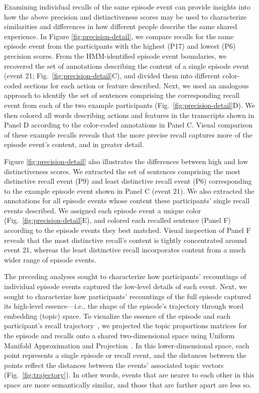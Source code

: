 \documentclass[10pt]{article}
\begin{document}
Examining individual recalls of the same episode event can provide insights into how the above precision and distinctiveness scores may be used to characterize similarities and differences in how different people describe the same shared experience.  In Figure \ref{fig:precision-detail}, we compare recalls for the same episode event from the participants with the highest (P17) and lowest (P6) precision scores.  From the HMM-identified episode event boundaries, we recovered the set of annotations describing the content of a single episode event (event 21; Fig.~\ref{fig:precision-detail}C), and divided them into different color-coded sections for each action or feature described.  Next, we used an analogous approach to identify the set of sentences comprising the corresponding recall event from each of the two example participants (Fig.~\ref{fig:precision-detail}D).  We then colored all words describing actions and features in the transcripts shown in Panel D according to the color-coded annotations in Panel C.  Visual comparison of these example recalls reveals that the more precise recall captures more of the episode event's content, and in greater detail.

Figure \ref{fig:precision-detail} also illustrates the differences between high and low distinctiveness scores.  We extracted the set of sentences comprising the most distinctive recall event (P9) and least distinctive recall event (P6) corresponding to the example episode event shown in Panel C (event 21).  We also extracted the annotations for all episode events whose content these participants' single recall events described.  We assigned each episode event a unique color (Fig.~\ref{fig:precision-detail}E), and colored each recalled sentence (Panel F) according to the episode events they best matched.  Visual inspection of Panel F reveals that the most distinctive recall's content is tightly concentrated around event 21, whereas the least distinctive recall incorporates content from a much wider range of episode events.

The preceding analyses sought to characterize how participants' recountings of individual episode events captured the low-level details of each event.  Next, we sought to characterize how participants' recountings of the full episode captured its high-level essence---i.e., the shape of the episode's trajectory through word embedding (topic) space.  To visualize the essence of the episode and each participant's recall trajectory~\citep{HeusEtal18a}, we projected the topic proportions matrices for the episode and recalls onto a shared two-dimensional space using Uniform Manifold Approximation and Projection~\citep[UMAP; ][]{McInEtal18}.  In this lower-dimensional space, each point represents a single episode or recall event, and the distances between the points reflect the distances between the events' associated topic vectors (Fig.~\ref{fig:trajectory}). In other words, events that are nearer to each other in this space are more semantically similar, and those that are farther apart are less so.
\end{document}
